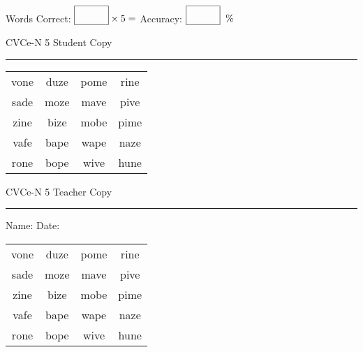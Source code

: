\documentclass{memoir}
\begin{document}
\small

Words Correct: $\fbox{\phantom{\huge 100}} \times 5 = $ Accuracy: $\fbox{\phantom{\huge 100}}\;\; \%$ 

\vfill

\newpage


\footnotesize \noindent
CVCe-N 5 \hfill Student Copy
\smallskip
\hrule

\Large

\setlength{\tabcolsep}{14pt}
\def\arraystretch{2}

{\selectfont


\begin{vplace}[0.5]
\begin{center}
\begin{tabular}{cccc}
vone & duze & pome & rine \\
sade & moze & mave & pive \\
zine & bize & mobe & pime \\
vafe & bape & wape & naze \\
rone & bope & wive & hune \\
\end{tabular}
\end{center}
\end{vplace}

}

\newpage

\footnotesize \noindent
CVCe-N 5 \hfill Teacher Copy
\smallskip
\hrule

\small

\vfill

\noindent
Name: \underline{\hspace{1.75in}} \hfill Date: \underline{\hspace{1in}}

\Large

{\selectfont


\begin{vplace}[0.5]
\begin{center}
\begin{tabular}{cccc}
vone & duze & pome & rine \\
sade & moze & mave & pive \\
zine & bize & mobe & pime \\
vafe & bape & wape & naze \\
rone & bope & wive & hune \\
\end{tabular}
\end{center}
\end{vplace}



}
\end{document}
